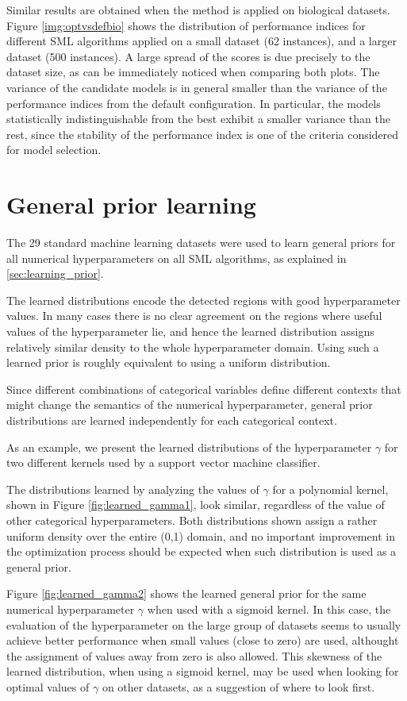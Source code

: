 Similar results are obtained when the method is applied on biological datasets. Figure
\ref{img:optvsdefbio} shows the distribution of performance indices for different SML algorithms
applied on a small dataset (62 instances), and a larger dataset (500 instances). A large spread of
the scores is due precisely to the dataset size, as can be immediately noticed when comparing
both plots. The variance of the candidate models is in general
smaller than the variance of the performance indices from the default configuration. In particular,
the models statistically indistinguishable from the best exhibit a smaller variance than the rest,
since the stability of the performance index is one of the criteria considered for model selection.

\section{General prior learning}

The 29 standard machine learning datasets were used to learn general priors for all numerical
hyperparameters on all SML algorithms, as explained in \ref{sec:learning_prior}. 

The learned distributions encode the detected regions with good hyperparameter values. In many cases
there is no clear agreement on the regions where useful values of the hyperparameter lie, and hence
the learned distribution assigns relatively similar density to the whole hyperparameter domain.
Using such a learned prior is roughly equivalent to using a uniform distribution.

Since different combinations of categorical variables define different contexts that might change
the semantics of the numerical hyperparameter, general prior distributions are learned independently
for each categorical context.

As an example, we present the learned distributions of the hyperparameter $\gamma$ for two different
kernels used by a support vector machine classifier.

The distributions learned by analyzing the values of $\gamma$ for a polynomial kernel, shown in
Figure \ref{fig:learned_gamma1}, look similar, regardless of the value of other categorical
hyperparameters. Both distributions shown assign a rather uniform density over the entire (0,1)
domain, and no important improvement in the optimization process should be expected when such
distribution is used as a general prior.

Figure \ref{fig:learned_gamma2} shows the learned general prior for the same numerical
hyperparameter $\gamma$ when used with a sigmoid kernel. In this case, the evaluation of the
hyperparameter on the large group of datasets seems to usually achieve better performance when small
values (close to zero) are used, althought the assignment of values away from zero is also allowed.
This skewness of the learned distribution, when using a sigmoid kernel, may be used when looking for
optimal values of $\gamma$ on other datasets, as a suggestion of where to look first.

